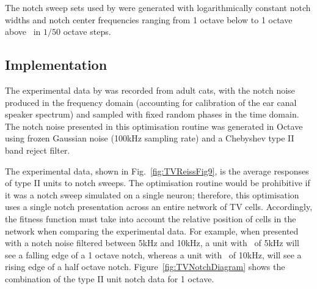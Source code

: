 

The notch sweep sets used by \citeauthor{ReissYoung:2005} were generated with
logarithmically constant notch widths and notch center frequencies ranging from
1 octave below to 1 octave above \BF~in $1/50$ octave steps.

\subsection{Implementation}

The experimental data by \citet{ReissYoung:2005} was recorded from adult cats,
with the notch noise produced in the frequency domain (accounting for
calibration of the ear canal speaker spectrum) and sampled with fixed random
phases in the time domain. The notch noise presented in this optimisation
routine was generated in Octave using frozen Gaussian noise (100kHz sampling
rate) and a Chebyshev type II band reject filter.

\smallskip{}

The experimental data, shown in Fig.~\ref{fig:TVReissFig9}, is the average
responses of type II units to notch sweeps. The optimisation routine would be
prohibitive if it was a notch sweep simulated on a single neuron; therefore,
this optimisation uses a single notch presentation across an entire network of
TV cells. Accordingly, the fitness function must take into account the relative
position of cells in the network when comparing the experimental data.  For
example, when presented with a notch noise filtered between 5kHz and 10kHz, a
unit with \CF~of 5kHz will see a falling edge of a 1 octave notch, whereas a
unit with \CF~of 10kHz, will see a rising edge of a half octave notch.
Figure~\ref{fig:TVNotchDiagram} shows the combination of the type II unit notch
data for 1 octave.

